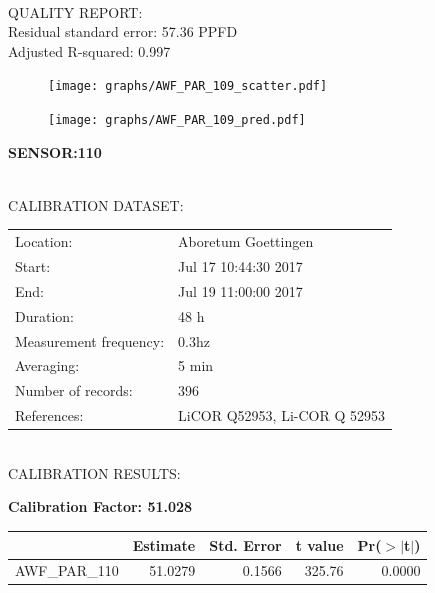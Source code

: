\documentclass[oneside]{report}
\begin{document}
\hrulefill\\
QUALITY REPORT:\\
Residual standard error: 57.36 PPFD\\
Adjusted R-squared: 0.997



\begin{figure}[H]
  \centering
  \texttt{[image: graphs/AWF\_PAR\_109\_scatter.pdf]}
\end{figure}




\begin{figure}[H]
  \centering
  \texttt{[image: graphs/AWF\_PAR\_109\_pred.pdf]}
\end{figure}

\pagebreak


\begin{center}
\large{\textbf{SENSOR:110}}\\
\end{center}

\hrulefill\\
CALIBRATION DATASET:\\
\begin{table}[h!]
  \centering
  \label{tab:table1}
  \begin{tabular}{ll}
    Location: & Aboretum Goettingen\\ 
    
    
    Start:  & Jul 17 10:44:30 2017 \\
    End:   & Jul 19 11:00:00 2017\\ 
    Duration: & 48 h\\
    Measurement frequency: & 0.3hz\\
    Averaging:  &5 min\\
    Number of records: & 396 \\
    References: & LiCOR Q52953, Li-COR Q 52953 \\
  \end{tabular}
\end{table}

\hrulefill\\
CALIBRATION RESULTS:\\


\begin{center}
\textbf{\large{Calibration Factor: 51.028}}\\
\end{center}
\begin{table}[ht]
\centering
\begin{tabular}{rrrrr}
  \hline
 & Estimate & Std. Error & t value & Pr($>$$|$t$|$) \\ 
  \hline
AWF\_PAR\_110 & 51.0279 & 0.1566 & 325.76 & 0.0000 \\ 
   \hline
\end{tabular}
\end{table}
\end{document}
